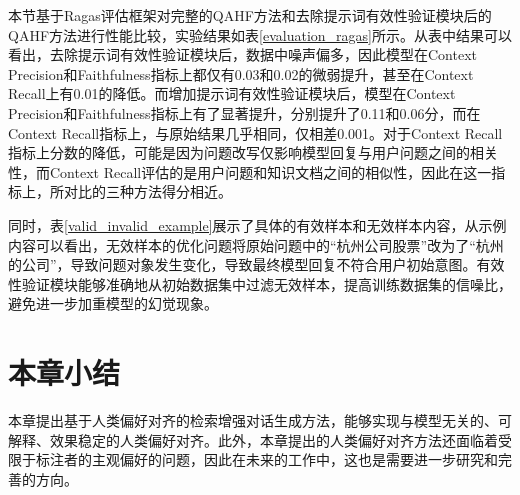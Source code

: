 本节基于Ragas评估框架对完整的QAHF方法和去除提示词有效性验证模块后的QAHF方法进行性能比较，实验结果如表\ref{evaluation_ragas}所示。从表中结果可以看出，去除提示词有效性验证模块后，数据中噪声偏多，因此模型在Context Precision和Faithfulness指标上都仅有0.03和0.02的微弱提升，甚至在Context Recall上有0.01的降低。而增加提示词有效性验证模块后，模型在Context Precision和Faithfulness指标上有了显著提升，分别提升了0.11和0.06分，而在Context Recall指标上，与原始结果几乎相同，仅相差0.001。对于Context Recall指标上分数的降低，可能是因为问题改写仅影响模型回复与用户问题之间的相关性，而Context Recall评估的是用户问题和知识文档之间的相似性，因此在这一指标上，所对比的三种方法得分相近。

同时，表\ref{valid_invalid_example}展示了具体的有效样本和无效样本内容，从示例内容可以看出，无效样本的优化问题将原始问题中的“杭州公司股票”改为了“杭州的公司”，导致问题对象发生变化，导致最终模型回复不符合用户初始意图。有效性验证模块能够准确地从初始数据集中过滤无效样本，提高训练数据集的信噪比，避免进一步加重模型的幻觉现象。

\section{本章小结}

本章提出基于人类偏好对齐的检索增强对话生成方法，能够实现与模型无关的、可解释、效果稳定的人类偏好对齐。此外，本章提出的人类偏好对齐方法还面临着受限于标注者的主观偏好的问题，因此在未来的工作中，这也是需要进一步研究和完善的方向。